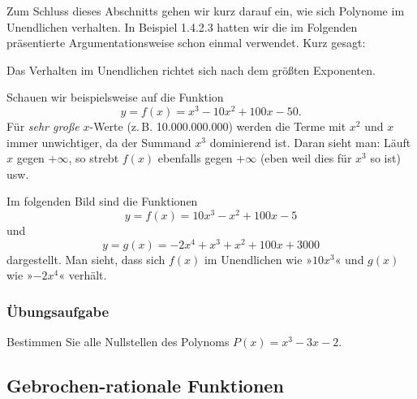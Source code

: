 Zum Schluss dieses Abschnitts gehen wir kurz darauf ein, wie sich Polynome im Unendlichen verhalten. In Beispiel 1.4.2.3 hatten wir die im Folgenden präsentierte Argumentationsweise schon einmal verwendet. Kurz gesagt:

Das Verhalten im Unendlichen richtet sich nach dem größten Exponenten.

Schauen wir beispielsweise auf die Funktion
\[ y = f(x) = x^3 - 10x^2 + 100x - 50 . \]
Für \emph{sehr große} $x$-Werte (z.\,B. 10.000.000.000) werden die Terme mit $x^2$ und $x$ immer unwichtiger, da der Summand $x^3$ dominierend ist. Daran sieht man: Läuft $x$ gegen $+\infty$, so strebt $f(x)$ ebenfalls gegen $+\infty$ (eben weil dies für $x^3$ so ist) usw.

Im folgenden Bild sind die Funktionen
\[ y = f(x) = 10x^3 - x^2 + 100x - 5 \]
und
\[ y = g(x) = -2x^4 + x^3 + x^2 + 100x + 3000 \]
dargestellt. Man sieht, dass sich $f(x)$ im Unendlichen wie »$10x^3$« und $g(x)$ wie »$-2x^4$« verhält.

\begin{center}
\end{center}

\subsubsection{Übungsaufgabe}

\begin{graukasten}
  Bestimmen Sie alle Nullstellen des Polynoms $P(x) = x^3 - 3x - 2$.
\end{graukasten}

\subsection{Gebrochen-rationale Funktionen}

